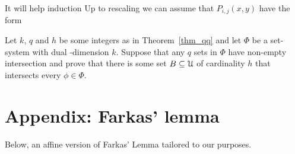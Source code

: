 \documentclass[sputnik.tex]{subfiles}
\begin{document}
% 
It will help induction 
% 
% 
Up to rescaling we can assume that $P_{i,j}(x,y)$ have the form 
% 
% 
% 
% 
% 
% 

\begin{exercise}\label{ex_dual_qqthm}
Let $k$, $q$ and $h$ be some integers as in Theorem~\ref{thm_qq} and let $\Phi$ be a set-system with dual \vc-dimension $k$.
Suppose that any $q$ sets in $\Phi$ have non-empty intersection and prove that there is some set $B\subseteq\EuScript U$ of cardinality $h$ that intersects every $\phi\in\Phi$.\QED
\end{exercise}




\section{Appendix: Farkas' lemma}\label{appendix}

Below, an affine version of Farkas' Lemma tailored to our purposes.
\end{document}
